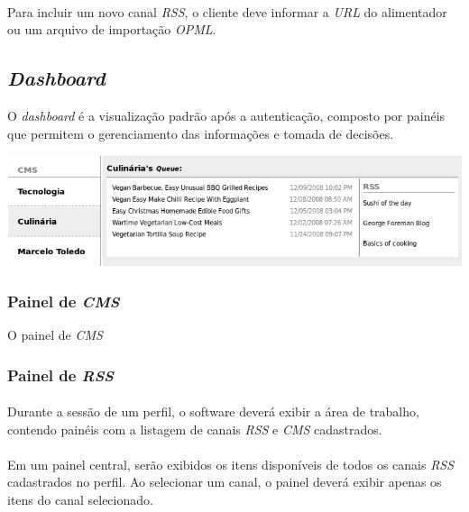 \documentclass[a4paper,12pt]{article}
\def\cms{\emph{CMS}}
\def\rss{\emph{RSS}}
\def\url{\emph{URL}}
\begin{document}
\paragraph{}
Para incluir um novo canal \rss{}, o cliente deve informar a \url{} do
alimentador ou um arquivo de importação \emph{OPML}.

\subsection{\emph{Dashboard}}

O \emph{dashboard} é a visualização padrão após a autenticação, composto por
painéis que permitem o gerenciamento das informações e tomada de decisões. 

\begin{center}
\includegraphics[scale=0.5]{dashboard.png}
\end{center}

\subsubsection{Painel de \cms{}}

O painel de \cms{} 

\subsubsection{Painel de \rss{}}


\paragraph{}
Durante a sessão de um perfil, o software deverá exibir a área de trabalho,
contendo painéis com a listagem de canais \rss{} e \cms{} cadastrados.

\paragraph{}
Em um painel central, serão exibidos os itens disponíveis de todos os canais
\rss{} cadastrados no perfil. Ao selecionar um canal, o painel deverá exibir
apenas os itens do canal selecionado.
\end{document}
